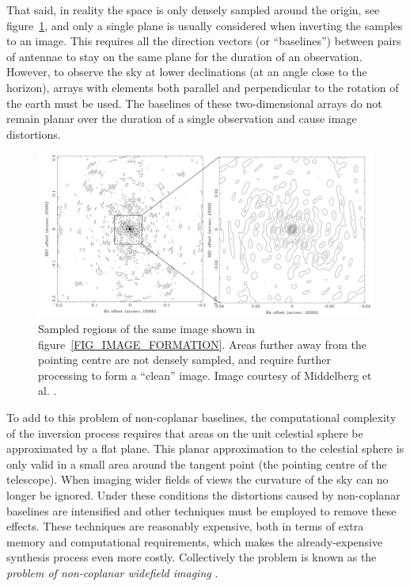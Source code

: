 \documentclass[a4paper, two column]{article}
\begin{document}
That said, in reality the space is only densely sampled around the origin, see figure~\ref{FIG_PSF}, and only a single plane is usually considered when inverting the samples to an image. This 
requires all the direction vectors (or ``baselines'') between pairs of antennae to stay on the same plane for the duration of an observation. However, to observe the sky at lower declinations 
(at an angle close to the horizon), arrays with elements both parallel and perpendicular to the rotation of the earth must be used. The baselines of these two-dimensional arrays do not remain 
planar over the duration of a single observation and cause image distortions. 

\begin{figure}[h]
 \begin{mdframed}
 \centering
 \includegraphics[width=1.0\textwidth]{psf.png}
 \caption[PSF]{Sampled regions of the same image shown in figure~\ref{FIG_IMAGE_FORMATION}. Areas further away from the pointing centre are not densely sampled, and require further processing to form a
 ``clean'' image. Image courtesy of Middelberg et al. \cite{middelberg2008high}.}
  \label{FIG_PSF}
 \end{mdframed}
\end{figure}

To add to this problem of non-coplanar baselines, the computational complexity of the inversion process requires that areas on the unit celestial sphere be approximated by a flat plane. This 
planar approximation to the celestial sphere is only valid in a small area around the tangent point (the pointing centre of the telescope). When imaging wider fields of views the curvature of the sky
can no longer be ignored. Under these conditions the distortions caused by non-coplanar baselines are intensified and other techniques must be employed to remove these effects. These techniques are
reasonably expensive, both in terms of extra memory and computational requirements, which makes the already-expensive synthesis process even more costly. Collectively the problem is known as the 
\textit{problem of non-coplanar widefield imaging} \cite{taylor1999synthesis}. 
\end{document}
